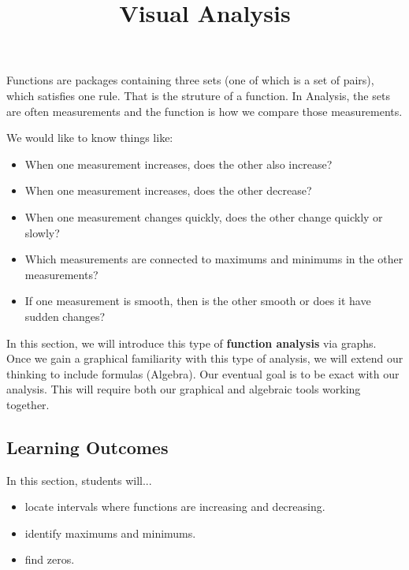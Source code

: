 \documentclass{ximera}
\title{Visual Analysis}
\begin{document}
\begin{abstract}
\end{abstract}
\maketitle




Functions are packages containing three sets (one of which is a set of pairs), which satisfies one rule.  That is the struture of a function.  In Analysis, the sets are often measurements and the function is how we compare those measurements.

We would like to know things like:

\begin{itemize}
\item When one measurement increases, does the other also increase?
\item When one measurement increases, does the other decrease?
\item When one measurement changes quickly, does the other change quickly or slowly?
\item Which measurements are connected to maximums and minimums in the other measurements?
\item If one measurement is smooth, then is the other smooth or does it have sudden changes?
\end{itemize}


In this section, we will introduce this type of \textbf{function analysis} via graphs. Once we gain a graphical familiarity with this type of analysis, we will extend our thinking to include formulas (Algebra).  Our eventual goal is to be exact with our analysis.  This will require both our graphical and algebraic tools working together.









\subsection{Learning Outcomes}

\begin{sectionOutcomes}
In this section, students will...

\begin{itemize}
\item locate intervals where functions are increasing and decreasing.
\item identify maximums and minimums.
\item find zeros.
\end{itemize}
\end{sectionOutcomes}
\end{document}
